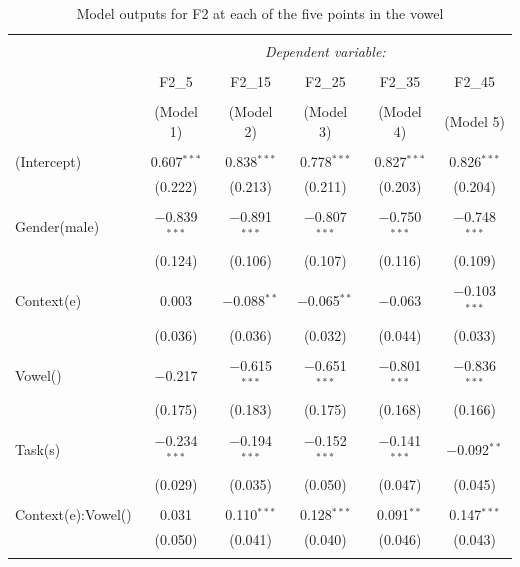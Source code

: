 \documentclass[12 pt]{article}
\begin{document}
\begin{table}[htbp] %
	\caption{Model outputs for F2 at each of the five points in the vowel} 
	\label{table_f2_fixed_effects} 
	\begin{tabular}{@{\extracolsep{5pt}}lccccc} 
		\\[-1.8ex]\hline 
		\hline \\[-1.8ex] 
		& \multicolumn{5}{c}{\textit{Dependent variable:}} \\ 
		\cline{2-6} 
		\\[-1.8ex] & F2\_5 & F2\_15 & F2\_25 & F2\_35 & F2\_45 \\ 
		\\[-1.8ex] & (Model 1) & (Model 2) & (Model 3) & (Model 4) & (Model 5)\\ 
		\hline \\[-1.8ex] 
		(Intercept) & 0.607$^{***}$ & 0.838$^{***}$ & 0.778$^{***}$ & 0.827$^{***}$ & 0.826$^{***}$ \\ 
		& (0.222) & (0.213) & (0.211) & (0.203) & (0.204) \\ 
		& & & & & \\ 
		Gender(male) & $-$0.839$^{***}$ & $-$0.891$^{***}$ & $-$0.807$^{***}$ & $-$0.750$^{***}$ & $-$0.748$^{***}$ \\ 
		& (0.124) & (0.106) & (0.107) & (0.116) & (0.109) \\ 
		& & & & & \\ 
		Context(e) & 0.003 & $-$0.088$^{**}$ & $-$0.065$^{**}$ & $-$0.063 & $-$0.103$^{***}$ \\ 
		& (0.036) & (0.036) & (0.032) & (0.044) & (0.033) \\ 
		& & & & & \\ 
		Vowel(\textipa{2}) & $-$0.217 & $-$0.615$^{***}$ & $-$0.651$^{***}$ & $-$0.801$^{***}$ & $-$0.836$^{***}$ \\ 
		& (0.175) & (0.183) & (0.175) & (0.168) & (0.166) \\ 
		& & & & & \\
		Task(s) & $-$0.234$^{***}$ & $-$0.194$^{***}$ & $-$0.152$^{***}$ & $-$0.141$^{***}$ & $-$0.092$^{**}$ \\ 
		& (0.029) & (0.035) & (0.050) & (0.047) & (0.045) \\ 
		& & & & & \\
		Context(e):Vowel(\textipa{2}) & 0.031 & 0.110$^{***}$ & 0.128$^{***}$ & 0.091$^{**}$ & 0.147$^{***}$ \\ 
		& (0.050) & (0.041) & (0.040) & (0.046) & (0.043) \\ 
		& & & & & \\   

\end{tabular}
\end{table}
\end{document}
